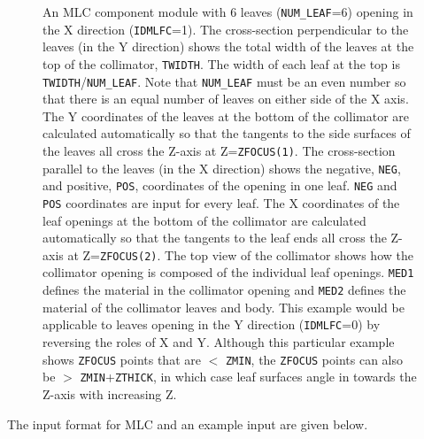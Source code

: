 \documentclass[12pt,twoside]{article}
\begin{document}
\begin{figure}[tp]
\begin{center}
\begin{htmlonly}
\end{htmlonly}
\end{center}
\caption[MLC CM geometry]
{An MLC component module with 6 leaves ({\tt NUM\_LEAF}=6) opening in the X
direction ({\tt IDMLFC}=1).  The cross-section perpendicular to the leaves
(in the Y direction) shows the total width of the leaves at
the top of the collimator, {\tt TWIDTH}.  The width of each leaf at the top
is {\tt TWIDTH}/{\tt NUM\_LEAF}.  Note that {\tt NUM\_LEAF} must be
an even number so that there is an equal number of leaves on either side
of the X axis.  The Y coordinates of the leaves
at the bottom of the collimator are calculated automatically so that
the tangents to the
side surfaces of the leaves all cross the Z-axis at Z={\tt ZFOCUS(1)}.  The
cross-section parallel to the leaves (in the X direction) shows the negative,
{\tt NEG},
and positive, {\tt POS}, coordinates of the opening in one leaf.
{\tt NEG} and {\tt POS} coordinates are input for every leaf.
The X coordinates
of the leaf openings at the bottom of the collimator are calculated
automatically so that the tangents to the leaf ends all cross the Z-axis at
Z={\tt ZFOCUS(2)}.  The
top view of the collimator shows how the collimator opening is composed
of the individual leaf openings.  {\tt MED1} defines the material in the collimator
opening and {\tt MED2} defines the material of the collimator leaves and body.
This example would be applicable to leaves opening
in the Y direction ({\tt IDMLFC}=0) by reversing the roles of X and Y.  Although this
particular example shows {\tt ZFOCUS} points that are $<$ {\tt ZMIN}, the {\tt ZFOCUS}
points can also be $>$ {\tt ZMIN}+{\tt ZTHICK}, in which case leaf surfaces angle
in towards the Z-axis with increasing Z.}
\label{fig_MLCD}
\end{figure}


\clearpage

The input format for MLC and an example input are given below.
\begin{small}

\end{small}



\end{document}
